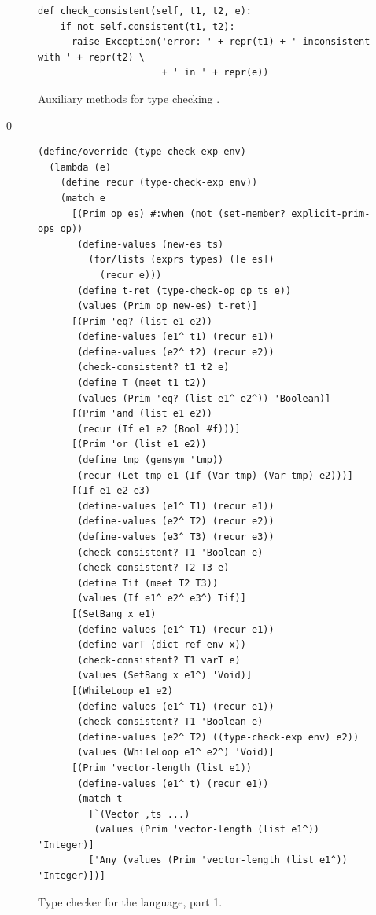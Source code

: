 \documentclass[7x10]{TimesAPriori_MIT}%
\def\racketEd{0}
\def\edition{1}
\numberwithin{theorem}{chapter}
\numberwithin{definition}{chapter}
\numberwithin{equation}{chapter}
\begin{document}
{\begin{figure}[tbp]
\begin{tcolorbox}[colback=white]
\begin{lstlisting}[basicstyle=\ttfamily\scriptsize]
  def check_consistent(self, t1, t2, e):
    if not self.consistent(t1, t2):
      raise Exception('error: ' + repr(t1) + ' inconsistent with ' + repr(t2) \
                      + ' in ' + repr(e))

\end{lstlisting}
\end{tcolorbox}

\caption{Auxiliary methods for type checking \LangGrad{}.}
\label{fig:type-check-Lgradual-aux}
\end{figure}

\fi}


{\if\edition\racketEd        
\begin{figure}[tbp]
\begin{tcolorbox}[colback=white]  
\begin{lstlisting}[basicstyle=\ttfamily\footnotesize]
(define/override (type-check-exp env)
  (lambda (e)
    (define recur (type-check-exp env))
    (match e
      [(Prim op es) #:when (not (set-member? explicit-prim-ops op))
       (define-values (new-es ts)
         (for/lists (exprs types) ([e es])
           (recur e)))
       (define t-ret (type-check-op op ts e))
       (values (Prim op new-es) t-ret)]
      [(Prim 'eq? (list e1 e2))
       (define-values (e1^ t1) (recur e1))
       (define-values (e2^ t2) (recur e2))
       (check-consistent? t1 t2 e)
       (define T (meet t1 t2))
       (values (Prim 'eq? (list e1^ e2^)) 'Boolean)]
      [(Prim 'and (list e1 e2))
       (recur (If e1 e2 (Bool #f)))]
      [(Prim 'or (list e1 e2))
       (define tmp (gensym 'tmp))
       (recur (Let tmp e1 (If (Var tmp) (Var tmp) e2)))]
      [(If e1 e2 e3)
       (define-values (e1^ T1) (recur e1))
       (define-values (e2^ T2) (recur e2))
       (define-values (e3^ T3) (recur e3))
       (check-consistent? T1 'Boolean e)
       (check-consistent? T2 T3 e)
       (define Tif (meet T2 T3))
       (values (If e1^ e2^ e3^) Tif)]
      [(SetBang x e1)
       (define-values (e1^ T1) (recur e1))
       (define varT (dict-ref env x))
       (check-consistent? T1 varT e)
       (values (SetBang x e1^) 'Void)]
      [(WhileLoop e1 e2)
       (define-values (e1^ T1) (recur e1))
       (check-consistent? T1 'Boolean e)
       (define-values (e2^ T2) ((type-check-exp env) e2))
       (values (WhileLoop e1^ e2^) 'Void)]
      [(Prim 'vector-length (list e1))
       (define-values (e1^ t) (recur e1))
       (match t
         [`(Vector ,ts ...)
          (values (Prim 'vector-length (list e1^)) 'Integer)]
         ['Any (values (Prim 'vector-length (list e1^)) 'Integer)])]
\end{lstlisting}
\end{tcolorbox}
\caption{Type checker for the \LangGrad{} language, part 1.}
\label{fig:type-check-Lgradual-1}
\end{figure}

}
\end{document}
